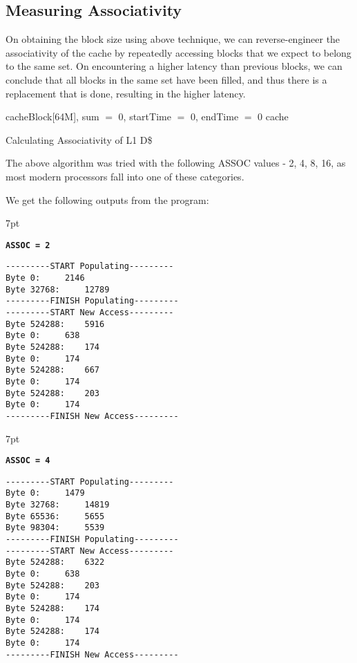 \documentclass[12pt,a4paper,english]{paper}
\newenvironment{results}{%
  \def\FrameCommand{%
    \hspace{1pt}%
    {\color{blue}\vrule width 2pt}%
    {\color{formalblue}\vrule width 4pt}%
    \colorbox{formalblue}%
  }%
  \MakeFramed{\advance\hsize-\width\FrameRestore}%
  \noindent\hspace{-4.55pt}%
  \begin{adjustwidth}{7pt}{}%
  \vspace{2pt}\vspace{2pt}%
}
{%
  \vspace{2pt}\end{adjustwidth}\endMakeFramed%
}
\begin{document}
\subsection{Measuring Associativity}
On obtaining the block size using above technique, we can reverse-engineer the associativity of the cache by repeatedly accessing blocks that we expect to belong to the same set. On encountering a higher latency than previous blocks, we can conclude that all blocks in the same set have been filled, and thus there is a replacement that is done, resulting in the higher latency.

\begin{algorithm}[H]
\SetAlgoLined
{}
  \init cacheBlock[64M], sum $=$ 0, startTime $=$ 0, endTime $=$ 0\; 
  \clear cache\;
 \caption{Calculating Associativity of L1 D\$}
\end{algorithm}

The above algorithm was tried with the following ASSOC values - 2, 4, 8, 16, as most modern processors fall into one of these categories.

We get the following outputs from the program:

\begin{results}
\texttt{\textbf{ASSOC = 2}}
\begin{verbatim}
---------START Populating---------
Byte 0: 	2146
Byte 32768: 	12789
---------FINISH Populating---------
---------START New Access---------
Byte 524288: 	5916
Byte 0: 	638
Byte 524288: 	174
Byte 0: 	174
Byte 524288: 	667
Byte 0: 	174
Byte 524288: 	203
Byte 0: 	174
---------FINISH New Access---------
\end{verbatim}
\end{results}

\begin{results}
\texttt{\textbf{ASSOC = 4}}
\begin{verbatim}
---------START Populating---------
Byte 0: 	1479
Byte 32768: 	14819
Byte 65536: 	5655
Byte 98304: 	5539
---------FINISH Populating---------
---------START New Access---------
Byte 524288: 	6322
Byte 0: 	638
Byte 524288: 	203
Byte 0: 	174
Byte 524288: 	174
Byte 0: 	174
Byte 524288: 	174
Byte 0: 	174
---------FINISH New Access---------
\end{verbatim}
\end{results}
\end{document}
